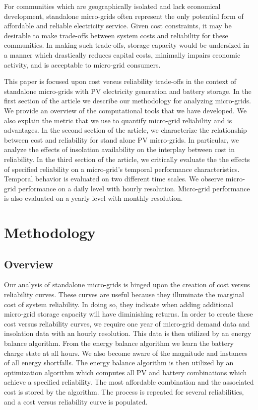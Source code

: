 \documentclass{article}
\begin{document}
For communities which are geographically isolated and lack economical development, standalone micro-grids often represent the only potential form of affordable and reliable electricity service. 
Given cost constraints, it may be desirable to make trade-offs between system costs and reliability for these communities. 
In making such trade-offs, storage capacity would be undersized in a manner which 
drastically %
reduces capital costs, minimally impairs economic activity, and is acceptable to micro-grid consumers. 

This paper is focused upon cost versus reliability trade-offs in
the context of standalone micro-grids with PV electricity generation
and battery storage. 
In the first section of the article we describe our methodology 
for analyzing micro-grids. 
We provide an overview of the computational tools that we have developed.
We also explain the metric that we use to quantify micro-grid reliability
and is advantages.
In the second section of the article, we characterize the relationship 
between cost and reliability for stand alone PV micro-grids. 
In particular, we analyze the effects of insolation availability on 
the interplay between cost in reliability. 
In the third section of the article, we critically evaluate the 
the effects of specified reliability on a micro-grid's temporal performance 
characteristics. 
Temporal behavior is evaluated on two different time scales. 
We observe micro-grid performance on a daily level with hourly resolution. 
Micro-grid performance is also evaluated on a yearly level 
with monthly resolution. 

\section{Methodology}
\subsection{Overview}

Our analysis of standalone micro-grids is hinged upon the creation of cost versus reliability curves.
These curves are useful because they illuminate the marginal cost of system reliability. 
In doing so, they indicate when adding additional micro-grid storage capacity will have diminishing returns.
In order to create these cost versus reliability curves, we require one year of micro-grid demand data and insolation data with an hourly resolution.
This data is then utilized by an energy balance algorithm.
From the energy balance algorithm we learn the battery charge state at all hours. 
We also become aware of the magnitude and instances of all energy shortfalls. 
The energy balance algorithm is then utilized by an optimization algorithm which computes all PV and battery combinations which achieve a specified reliability. 
The most affordable combination and the associated cost is stored by the algorithm. 
The process is repeated for several reliabilities, and a cost versus reliability curve is populated. 
\end{document}
